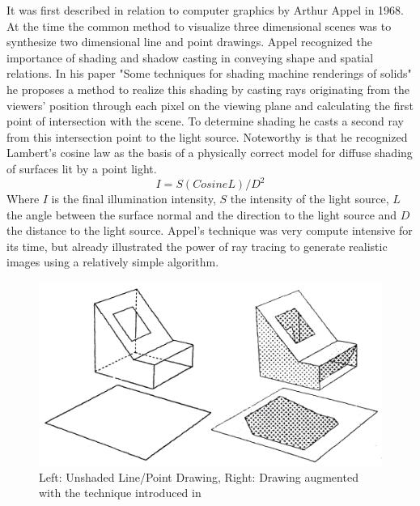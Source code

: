 \documentclass{ACGSeminar}
\begin{document}
It was first described in relation to computer graphics by Arthur Appel in 1968. At the time the common method to visualize three dimensional scenes was to synthesize two dimensional line and point drawings. Appel recognized the importance of shading and shadow casting in conveying shape and spatial relations. In his paper "Some techniques for shading machine renderings of solids" he proposes a method to realize this shading by casting rays originating from the viewers' position through each pixel on the viewing plane and calculating the first point of intersection with the scene. To determine shading he casts a second ray from this intersection point to the light source. Noteworthy is that he recognized Lambert's cosine law as the basis of a physically correct model for diffuse shading of surfaces lit by a point light.
\begin{equation}
I = S (Cosine L)/D^{2}
\end{equation}
Where $I$ is the final illumination intensity, $S$ the intensity of the light source, $L$ the angle between the surface normal and the direction to the light source and $D$ the distance to the light source.
Appel's technique was very compute intensive for its time, but already illustrated the power of ray tracing to generate realistic images using a relatively simple algorithm. \cite{Appel68}

\begin{figure}[htb!]
  \begin{centering}
    \includegraphics[width=12cm,natwidth=1233,natheight=661]{figures/Appel_Shading.png}\par
  \end{centering}
  \caption{Left: Unshaded Line/Point Drawing, Right: Drawing augmented with the technique introduced in \cite{Appel68}}
  \label{fig:appel_tracing}
\end{figure}
\end{document}
